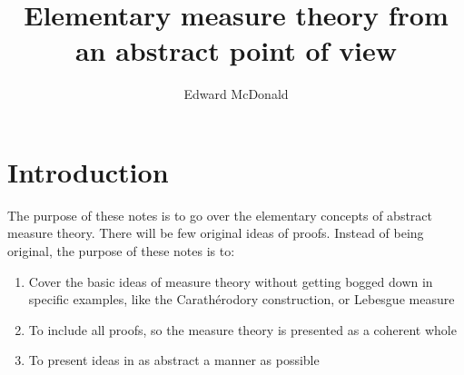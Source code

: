 \documentclass{owmaths}
\begin{document}
\subject{Measure Theory}
\author{Edward McDonald}
\title{Elementary measure theory from an abstract point of view}


\setlength\parindent{0pt}

\section{Introduction}
The purpose of these notes is to go over the elementary concepts of
abstract measure theory. There will be few original ideas of proofs. Instead
of being original, the purpose of these notes is to:
\begin{enumerate}
    \item{} Cover the basic ideas of measure theory without getting bogged
    down in specific examples, like the Carath\'erodory construction, or Lebesgue
    measure
    \item{} To include all proofs, so the measure theory is presented
    as a coherent whole
    \item{} To present ideas in as abstract a manner as possible
\end{enumerate}
\end{document}
